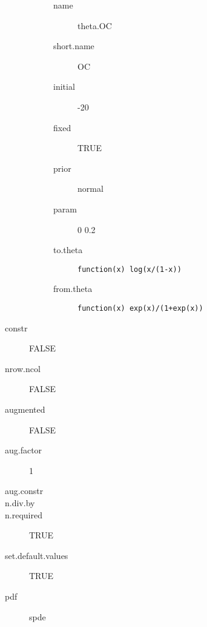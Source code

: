 \begin{description}
\begin{description}
\begin{description}
	 	 	 \item[ name ] theta.OC 
	 	 	 \item[ short.name ] OC 
	 	 	 \item[ initial ] -20 
	 	 	 \item[ fixed ] TRUE 
	 	 	 \item[ prior ] normal 
	 	 	 \item[ param ] 0 0.2 
	 	 	 \item[ to.theta ] \verb|function(x) log(x/(1-x))| 
	 	 	 \item[ from.theta ] \verb|function(x) exp(x)/(1+exp(x))| 
	 	 \end{description}
	 \end{description}
	 \item[ constr ] FALSE 
	 \item[ nrow.ncol ] FALSE 
	 \item[ augmented ] FALSE 
	 \item[ aug.factor ] 1 
	 \item[ aug.constr ]  
	 \item[ n.div.by ]  
	 \item[ n.required ] TRUE 
	 \item[ set.default.values ] TRUE 
	 \item[ pdf ] spde 
\end{description}
